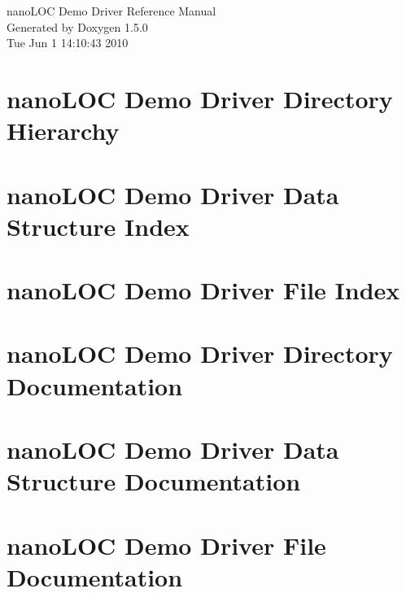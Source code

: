 \documentclass[a4paper]{book}
\begin{document}
\begin{titlepage}
\vspace*{7cm}
\begin{center}
{\Large nano\-LOC Demo Driver Reference Manual}\\
\vspace*{1cm}
{\large Generated by Doxygen 1.5.0}\\
\vspace*{0.5cm}
{\small Tue Jun 1 14:10:43 2010}\\
\end{center}
\end{titlepage}
\clearemptydoublepage
{}
\tableofcontents
\clearemptydoublepage
{}
\chapter{nano\-LOC Demo Driver Directory Hierarchy}

\chapter{nano\-LOC Demo Driver Data Structure Index}

\chapter{nano\-LOC Demo Driver File Index}

\chapter{nano\-LOC Demo Driver Directory Documentation}



\chapter{nano\-LOC Demo Driver Data Structure Documentation}







\chapter{nano\-LOC Demo Driver File Documentation}


























\printindex
\end{document}
